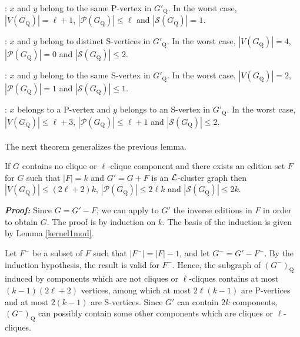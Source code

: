 \documentclass[12pt]{article}
\def\L{{\cal L}}
\begin{document}
\medskip

: $x$ and $y$ belong to the same P-vertex in $G'_{\mathrm Q}$. In the worst case, $|V(G_{\mathrm Q})| = \ell +1$, $|{\mathcal P}(G_{\mathrm Q})| \leq \ell$ and $|{\mathcal S}(G_{\mathrm Q})| =1$.

\medskip

: $x$ and $y$ belong to distinct S-vertices in $G'_{\mathrm Q}$. In the worst case, $|V(G_{\mathrm Q})| =4$,   $|{\mathcal P}(G_{\mathrm Q})| =0$ and $|{\mathcal S}(G_{\mathrm Q})| \leq 2$.

\medskip

: $x$ and $y$ belong to the same S-vertex in $G'_{\mathrm Q}$. In the worst case, $|V(G_{\mathrm Q})| =2$, $|{\mathcal P}(G_{\mathrm Q})| =1$ and $|{\mathcal S}(G_{\mathrm Q})| \leq 1$.

\medskip

: $x$ belongs to a P-vertex and $y$ belongs to an S-vertex in $G'_{\mathrm Q}$. In the worst case, $|V(G_{\mathrm Q})| \leq  \ell+3$, $|{\mathcal P}(G_{\mathrm Q})| \leq \ell +1$ and $|{\mathcal S}(G_{\mathrm Q})| \leq 2$.
\hfill \framebox[.09in] \\ \\

The next theorem generalizes the previous lemma.

\begin{teo} \label{sizeG_Q}
If $G$ contains no clique or $\ell$-clique component and there
exists an edition set $F$ for $G$ such that $|F|=k$ and
$G'=G+F$ is an $\L$-cluster graph then $|V(G_{\mathrm Q})|
\leq (2\ell +2)k$, $|{\mathcal P}(G_{\mathrm Q})| \leq 2\ell k$
and $|{\mathcal S}(G_{\mathrm Q})| \leq 2k$.
\end{teo}

\emph{\textbf{Proof:}} Since $G = G'-F$, we can apply to $G'$ the inverse
editions in $F$ in order to obtain $G$. The proof is by induction on $k$.
The basis of the induction is given by Lemma \ref{kernel1mod}.

Let $F^{-}$ be a subset of $F$ such that $|F^{-}|=|F|-1$, and let
$G^{-}=G'- F^{-}$. By the induction hypothesis, the result is
valid for $F^{-}$. Hence, the subgraph of ${(G^{-})}_{\mathrm Q}$
induced by components which are not cliques or $\ell$-cliques
contains at most $(k-1)(2\ell+2)$ vertices, among which at most
$2\ell(k-1)$ are P-vertices and at most $2(k-1)$ are S-vertices.
Since $G'$ can contain $2k$ components, ${(G^{-})}_{\mathrm Q}$
can possibly contain some other components which are cliques or
$\ell$-cliques.
\end{document}
